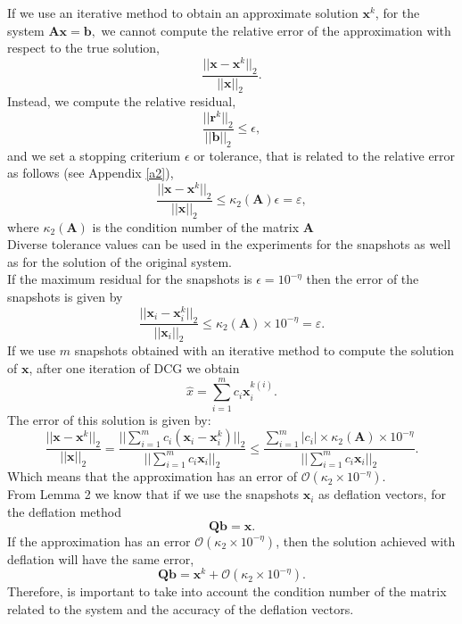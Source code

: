 \documentclass[12pt]{article}
\begin{document}
If we use an iterative method to obtain an approximate solution $\mathbf{x}^k$, for the system $\mathbf{A}\mathbf{x}=\mathbf{b},$ we cannot compute the relative error of the approximation with respect to the true solution, 
$$\frac{||\mathbf{x}-\mathbf{x}^k||_2}{||\mathbf{x}||_2}.$$
Instead, we compute the relative residual, $$ \frac{||\mathbf{r}^k||_2}{||\mathbf{b}||_2}\leq \epsilon,$$
and we set a stopping criterium $\epsilon$ or tolerance, that is related to the relative error as follows (see Appendix \ref{a2}),
$$\frac{||\mathbf{x}-\mathbf{x}^k||_2}{||\mathbf{x}||_2}\leq \kappa_2(\mathbf{A}) \epsilon=\varepsilon,$$
where $\kappa_2(\mathbf{A})$ is the condition number of the matrix $\mathbf{A}$\\
Diverse tolerance values can be used in the experiments for the snapshots as well as for the solution of the original system. \\
If the maximum residual for the snapshots is $\epsilon=10^{-\eta}$ then the error of the snapshots is given by
$$\frac{||\mathbf{x}_i-\mathbf{x}_i^k||_2}{||\mathbf{x}_i||_2}\leq \kappa_2(\mathbf{A})\times 10^{-\eta}=\varepsilon.$$
If we use $m$ snapshots obtained with an iterative method to compute the solution of $\mathbf{x}$, after one iteration of DCG we obtain
$$\hat{x}=\sum_{i=1}^m {c}_i\mathbf{x}_i^{k(i)}.$$
The error of this solution is given by:
$$\frac{||\mathbf{x}-\mathbf{x}^k||_2}{||\mathbf{x}||_2}=
\frac{||\sum_{i=1}^m {c}_i(\mathbf{x}_i-\mathbf{x}_i^{k})||_2}{||\sum_{i=1}^m {c}_i\mathbf{x}_i||_2}\leq
\frac{\sum_{i=1}^m| {c}_i|\times \kappa_2(\mathbf{A})\times 10^{-\eta}}{||\sum_{i=1}^m {c}_i\mathbf{x}_i||_2}.
$$
Which means that the approximation has an error of $\mathcal{O}(\kappa_2\times10^{-\eta}).$
\\From Lemma 2 we know that if we use the snapshots $\mathbf{x}_i$ as deflation vectors, for the deflation method $$\mathbf{Q}\mathbf{b}=\mathbf{x}.$$ 
If the approximation has an error $\mathcal{O}(\kappa_2\times10^{-\eta})$, then the solution achieved with deflation will have the same error, 
$$\mathbf{Q}\mathbf{b}=\mathbf{x}^k+\mathcal{O}(\kappa_2\times10^{-\eta}).$$
Therefore, is important to take into account the condition number of the matrix related to the system  and the accuracy of the deflation vectors.
\end{document}
